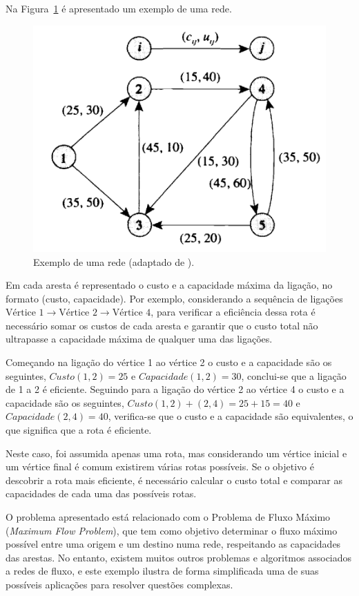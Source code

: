 Na Figura~\ref{fig:exemplo-network-flow-rede} é apresentado um exemplo de uma rede.

\begin{figure}[H]
    \centering
    \includegraphics[width=.55\linewidth]{Imagens/exemplo-network-flow-rede}
    \caption{Exemplo de uma rede (adaptado de \cite{Networkflows-Ahuja-1993}).}
    \label{fig:exemplo-network-flow-rede}
\end{figure}

Em cada aresta é representado o custo e a capacidade máxima da ligação, no formato (custo, capacidade). Por exemplo, considerando a sequência de ligações $\text{Vértice 1} \rightarrow \text{Vértice 2} \rightarrow \text{Vértice 4}$, para verificar a eficiência dessa rota é necessário somar os custos de cada aresta e garantir que o custo total não ultrapasse a capacidade máxima de qualquer uma das ligações.

Começando na ligação do vértice 1 ao vértice 2 o custo e a capacidade são os seguintes, $ Custo (1, 2) = 25 $ e $ Capacidade (1,2) = 30 $, conclui-se que a ligação de 1 a 2 é eficiente. Seguindo para a ligação do vértice 2 ao vértice 4 o custo e a capacidade são os seguintes, $ Custo (1, 2) + (2, 4) = 25 + 15 = 40 $ e $ Capacidade (2, 4) = 40 $, verifica-se que o custo e a capacidade são equivalentes, o que significa que a rota é eficiente.

Neste caso, foi assumida apenas uma rota, mas considerando um vértice inicial e um vértice final é comum existirem várias rotas possíveis. Se o objetivo é descobrir a rota mais eficiente, é necessário calcular o custo total e comparar as capacidades de cada uma das possíveis rotas.

O problema apresentado está relacionado com o Problema de Fluxo Máximo (\textit{Maximum Flow Problem}), que tem como objetivo determinar o fluxo máximo possível entre uma origem e um destino numa rede, respeitando as capacidades das arestas. No entanto, existem muitos outros problemas e algoritmos associados a redes de fluxo, e este exemplo ilustra de forma simplificada uma de suas possíveis aplicações para resolver questões complexas.

